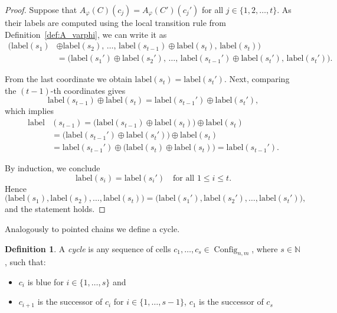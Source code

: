 \documentclass{article}
\theoremstyle{plain}
\theoremstyle{definition}
\newtheorem{definition}[theorem]{Definition}
\DeclareMathOperator{\Config}{Config}
\begin{document}
\begin{proof}

Suppose that $A_\varphi(C)(c_j)=A_\varphi(C')(c_j')$ for all $j \in \{1, 2, \dots, t\}$. As their labels are computed using the local transition rule from Definition~\ref{def:A_varphi}, we can write it as
\begin{align*}
      \bigl(\mathrm{label}(s_1) & \oplus \mathrm{label}(s_2),\, \dots,\, \mathrm{label}(s_{t-1}) \oplus \mathrm{label}(s_{t}),\, \mathrm{label}(s_{t})\bigr)
      \\ & =
    \bigl(\mathrm{label}(s_1') \oplus \mathrm{label}(s_2'),\, \dots,\, \mathrm{label}(s_{t-1}') \oplus \mathrm{label}(s_{t}'),\, \mathrm{label}(s_{t}')\bigl).  
\end{align*}

From the last coordinate we obtain $\mathrm{label}(s_{t}) = \mathrm{label}(s_{t}')$.  
Next, comparing the $(t-1)$-th coordinates gives
\[
    \mathrm{label}(s_{t-1}) \oplus \mathrm{label}(s_{t}) = \mathrm{label}(s_{t-1}') \oplus \mathrm{label}(s_{t}'),
\]
which implies
\begin{align*}
        \mathrm{label}&(s_{t-1})  = \bigl(\mathrm{label}(s_{t-1})\oplus \mathrm{label}(s_{t})\bigr) \oplus \mathrm{label}(s_{t}) \\ & = \bigl(\mathrm{label}(s_{t-1}')\oplus \mathrm{label}(s_{t}')\bigr) \oplus \mathrm{label}(s_{t}) \\ & = \mathrm{label}(s_{t-1}') \oplus \bigl(\mathrm{label}(s_{t}) \oplus \mathrm{label}(s_{t})\bigr) = \mathrm{label}(s_{t-1}').
\end{align*}

By induction, we conclude
\[
    \mathrm{label}(s_{i})  = \mathrm{label}(s_{i}')  \quad \text{for all } 1 \leq i \leq t.
\]
Hence 
\[
\bigl(\mathrm{label}(s_{1}), \mathrm{label}(s_{2}) , \dots, \mathrm{label}(s_{t}) \bigr) = \bigl(\mathrm{label}(s_{1}'), \mathrm{label}(s_{2}') , \dots, \mathrm{label}(s_{t}') \bigr),
\]
and the statement holds.


\end{proof}

Analogously to pointed chains we define a cycle.


\begin{definition}
    A \emph{cycle} is any sequence of cells $c_1, \dots, c_s \in \Config_{n,m}$, where $s \in \mathbb{N}$, such that:
    \begin{itemize}
        \item $c_i$ is blue for $i \in \{1, \dots, s\}$ and 
        \item $c_{i+1}$ is the successor of $c_{i}$ for $i \in \{1, \dots, s-1\}$, $c_1$ is the successor of $c_s$
    \end{itemize}
\end{definition}
\end{document}
